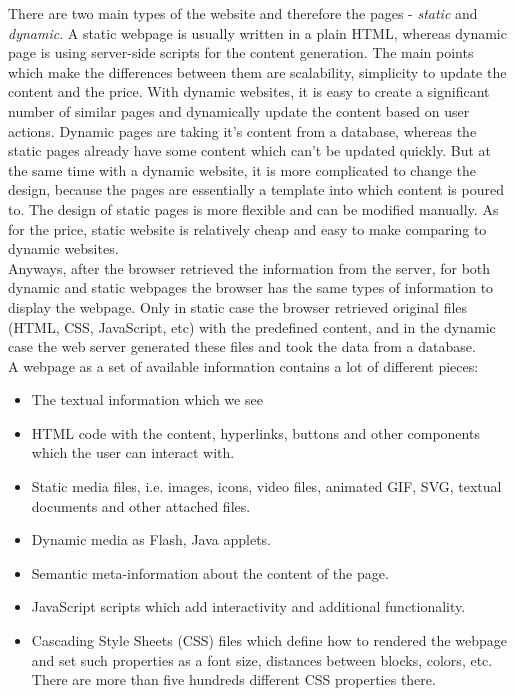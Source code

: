 There are two main types of the website and therefore the pages - \textit{static} and \textit{dynamic}. A static webpage is usually written in a plain HTML, whereas dynamic page is using server-side scripts for the content generation. The main points which make the differences between them are scalability, simplicity to update the content and the price. With dynamic websites, it is easy to create a significant number of similar pages and dynamically update the content based on user actions. Dynamic pages are taking it's content from a database, whereas the static pages already have some content which can't be updated quickly. But at the same time with a dynamic website, it is more complicated to change the design, because the pages are essentially a template into which content is poured to. The design of static pages is more flexible and can be modified manually. As for the price, static website is relatively cheap and easy to make comparing to dynamic websites.\\ 

Anyways, after the browser retrieved the information from the server, for both dynamic and static webpages the browser has the same types of information to display the webpage. Only in static case the browser retrieved original files (HTML, CSS, JavaScript, etc)  with the predefined content, and in the dynamic case the web server generated these files and took the data from a database.\\

A webpage as a set of available information contains a lot of different pieces:

\begin{itemize}
    \item The textual information which we see
    \item HTML code with the content, hyperlinks, buttons and other components which the user can interact with.
    \item Static media files, i.e. images, icons, video files, animated GIF, SVG, textual documents and other attached files.
    \item Dynamic media as Flash, Java applets.
    \item Semantic meta-information about the content of the page.
    \item JavaScript scripts which add interactivity and additional functionality.
    \item Cascading Style Sheets (CSS) files which define how to rendered the webpage and set such properties as a font size, distances between blocks, colors, etc. There are more than five hundreds different CSS properties there.
\end{itemize}

